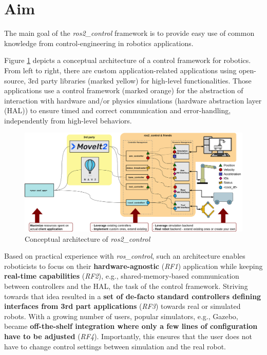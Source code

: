 \documentclass[journal]{IEEEtran}
\begin{document}
\section{Aim}
\label{sec:aim}
The main goal of the \emph{ros2\_control} framework is to provide easy use of common knowledge from control-engineering in robotics applications.

Figure \ref{fig:ros2_control_ach} depicts a conceptual architecture of a control framework for robotics. From left to right, there are custom application-related applications using open-source, 3rd party libraries (marked yellow) for high-level functionalities.
Those applications use a control framework (marked orange) for the abstraction of interaction with hardware and/or physics simulations (hardware abstraction layer (HAL)) to ensure timed and correct communication and error-handling, independently from high-level behaviors.

\begin{figure}
    \centering
    \includegraphics[width=\columnwidth]{figures/ros2_control_overview}
    \caption{Conceptual architecture of \emph{ros2\_control}}
    \label{fig:ros2_control_ach}
\end{figure}

Based on practical experience with \emph{ros\_control}, such an architecture enables roboticists to focus on their \textbf{hardware-agnostic} (\emph{RF1}) application while keeping \textbf{real-time capabilities} (\emph{RF2}), e.g., shared-memory-based communication between controllers and the HAL, the task of the control framework.
Striving towards that idea resulted in a \textbf{set of de-facto standard controllers defining interfaces from 3rd part applications} (\emph{RF3}) towards real or simulated robots.
With a growing number of users, popular simulators, e.g., Gazebo, became \textbf{off-the-shelf integration where only a few lines of configuration have to be adjusted} (\emph{RF4}).
Importantly, this ensures that the user does not have to change control settings between simulation and the real robot.
\end{document}
